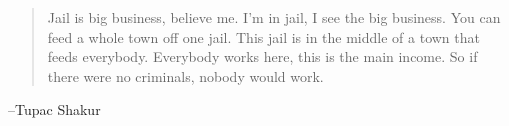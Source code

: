 \documentclass[letterpaper]{exam}
\begin{document}
  \else
    \vspace{10 cm}
    \begin{quote}
      \begin{em}
        Jail is big business, believe me. I'm in jail, I see the big business.
        You can feed a whole town off one jail. This jail is in the middle of a
        town that feeds everybody. Everybody works here, this is the main
        income. So if there were no criminals, nobody would work.
      \end{em}
    \end{quote}
    \hspace{2 cm} --Tupac Shakur
  \fi
\end{document}
